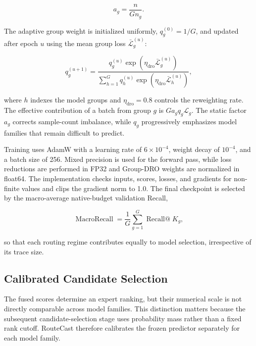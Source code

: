 \documentclass[conference]{IEEEtran}
\begin{document}
\begin{equation}
a_g=\frac{n}{G n_g}.
\label{eq:sample-balance}
\end{equation}

The adaptive group weight is initialized uniformly,
\(q_g^{(0)}=1/G\), and updated after epoch \(u\) using the mean group loss
\(\bar{\mathcal{L}}_g^{(u)}\):

\begin{equation}
q_g^{(u+1)}
=
\frac{
q_g^{(u)}
\exp\!\left(
\eta_{\mathrm{dro}}\bar{\mathcal{L}}_g^{(u)}
\right)
}{
\displaystyle
\sum_{h=1}^{G}
q_h^{(u)}
\exp\!\left(
\eta_{\mathrm{dro}}\bar{\mathcal{L}}_h^{(u)}
\right)
},
\label{eq:group-dro}
\end{equation}

where \(h\) indexes the model groups and
\(\eta_{\mathrm{dro}}=0.8\) controls the reweighting rate. The effective
contribution of a batch from group \(g\) is
\(G a_g q_g\mathcal{L}_g\). The static factor \(a_g\) corrects sample-count
imbalance, while \(q_g\) progressively emphasizes model families that remain
difficult to predict.

Training uses AdamW with a learning rate of \(6\times10^{-4}\), weight decay
of \(10^{-4}\), and a batch size of 256. Mixed precision is used for the
forward pass, while loss reductions are performed in FP32 and Group-DRO
weights are normalized in float64. The implementation checks inputs, scores,
losses, and gradients for non-finite values and clips the gradient norm to
1.0. The final checkpoint is selected by the macro-average native-budget
validation Recall,

\begin{equation}
\operatorname{MacroRecall}
=
\frac{1}{G}
\sum_{g=1}^{G}
\operatorname{Recall@}K_g,
\label{eq:macro-recall}
\end{equation}

so that each routing regime contributes equally to model selection,
irrespective of its trace size.
\subsection{Calibrated Candidate Selection}

The fused scores determine an expert ranking, but their numerical scale is not
directly comparable across model families. This distinction matters because
the subsequent candidate-selection stage uses probability mass rather than a
fixed rank cutoff. RouteCast therefore calibrates the frozen predictor
separately for each model family.
\end{document}
